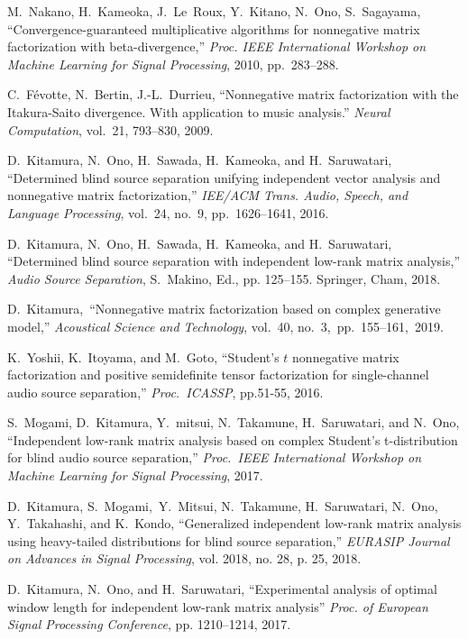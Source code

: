 \documentclass[honka]{nitkagawathesis}%
\begin{document}
\begin{thebibliography}{99}
  M.~Nakano, H.~Kameoka, J.~Le~Roux, Y.~Kitano, N.~Ono, S.~Sagayama, ``Convergence-guaranteed multiplicative algorithms for nonnegative matrix factorization with beta-divergence,''
  {\em Proc. IEEE International Workshop on Machine Learning for Signal Processing}, 2010, pp.~283--288.

  C.~Févotte, N.~Bertin, J.-L.~Durrieu, 
  ``Nonnegative matrix factorization with the Itakura-Saito divergence. With application to music analysis.'' 
  {\em Neural Computation}, vol.~21, 793--830, 2009.
    
  D.~Kitamura, N.~Ono, H.~Sawada, H.~Kameoka, and H.~Saruwatari,
  ``Determined blind source separation unifying independent vector analysis and nonnegative matrix factorization,'' 
  {\em IEE/ACM Trans. Audio, Speech, and Language Processing}, vol.~24, no.~9, pp.~1626--1641, 2016.

  D.~Kitamura, N.~Ono, H.~Sawada, H.~Kameoka, and H.~Saruwatari, ``Determined blind source separation with independent low-rank matrix analysis,'' 
  {\em Audio Source Separation}, S.~Makino, Ed., pp. 125--155. Springer, Cham, 2018.

  D.~Kitamura,~``Nonnegative matrix factorization based on complex generative model,''
  {\em Acoustical Science and Technology}, vol.~40, no.~3,~pp.~155--161,~2019.

  K.~Yoshii, K.~Itoyama, and M.~Goto, ``Student's $t$ nonnegative matrix factorization and positive semidefinite tensor    
  factorization for single-channel audio source separation,''
  {\em Proc.~ICASSP}, pp.51-55, 2016.

  S.~Mogami, D.~Kitamura, Y.~mitsui, N.~Takamune, H.~Saruwatari, and N.~Ono, ``Independent low-rank matrix analysis based on complex Student's t-distribution for blind audio source     separation,''
  {\em Proc.~IEEE International Workshop on Machine Learning for Signal Processing}, 2017. 
 
  D.~Kitamura, S.~Mogami,~Y.~Mitsui, N.~Takamune, H.~Saruwatari, N.~Ono, Y.~Takahashi, and K.~Kondo, 
  ``Generalized independent low-rank matrix analysis using heavy-tailed distributions for blind source separation,''
  {\em EURASIP Journal on Advances in Signal Processing}, vol. 2018, no. 28, p. 25, 2018. 
  
  D.~Kitamura, N.~Ono, and H.~Saruwatari, 
  ``Experimental analysis of optimal window length for independent low-rank matrix analysis'' 
  {\em Proc. of European Signal Processing Conference}, pp. 1210–1214, 2017.

\end{thebibliography}
% 


\appendix

%
\end{document}
